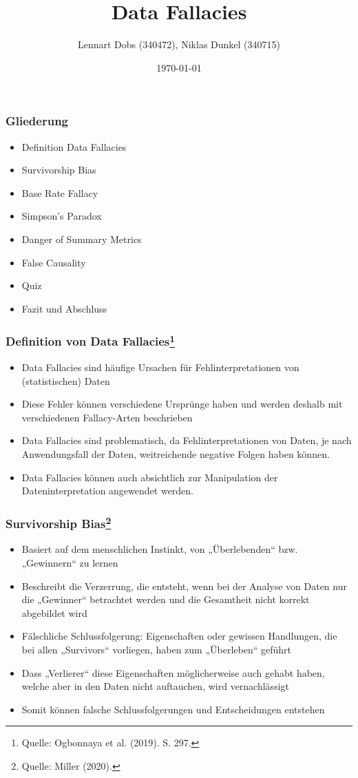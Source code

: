 \documentclass{beamer}
\title{Data Fallacies}
\author{Lennart Dobs (340472), Niklas Dunkel (340715)}
\date{\today}
\begin{document}
\frame{\titlepage}

\begin{frame}
\frametitle{Gliederung}
\begin{itemize}
    \item Definition Data Fallacies
    \item Survivorship Bias
    \item Base Rate Fallacy
    \item Simpson's Paradox
    \item Danger of Summary Metrics
    \item False Causality
    \item Quiz
    \item Fazit und Abschluss
\end{itemize}
\end{frame}

\begin{frame}
\frametitle{Definition von Data Fallacies\footnote{Quelle: {Ogbonnaya et al. (2019). S. 297.}}}
\begin{itemize}
    \item Data Fallacies sind häufige Ursachen für Fehlinterpretationen von (statistischen) Daten
    \item Diese Fehler können verschiedene Ursprünge haben und werden deshalb mit verschiedenen Fallacy-Arten beschrieben
    \item Data Fallacies sind problematisch, da Fehlinterpretationen von Daten, je nach Anwendungsfall der Daten, weitreichende negative Folgen haben können.
    \item Data Fallacies können auch absichtlich zur Manipulation der Dateninterpretation angewendet werden.
\end{itemize}
\end{frame}

\begin{frame}
\frametitle{Survivorship Bias\footnote{Quelle: {Miller (2020).}}}
\begin{itemize}
    \item Basiert auf dem menschlichen Instinkt, von „Überlebenden“ bzw. „Gewinnern“ zu lernen
    \item Beschreibt die Verzerrung, die entsteht, wenn bei der Analyse von Daten nur die „Gewinner“ betrachtet werden und die Gesamtheit nicht korrekt abgebildet wird
    \item Fälschliche Schlussfolgerung: Eigenschaften oder gewissen Handlungen, die bei allen „Survivors“ vorliegen, haben zum „Überleben“ geführt
    \item Dass „Verlierer“ diese Eigenschaften möglicherweise auch gehabt haben, welche aber in den Daten nicht auftauchen, wird vernachlässigt
    \item Somit können falsche Schlussfolgerungen und Entscheidungen entstehen
\end{itemize}
\end{frame}
\end{document}
